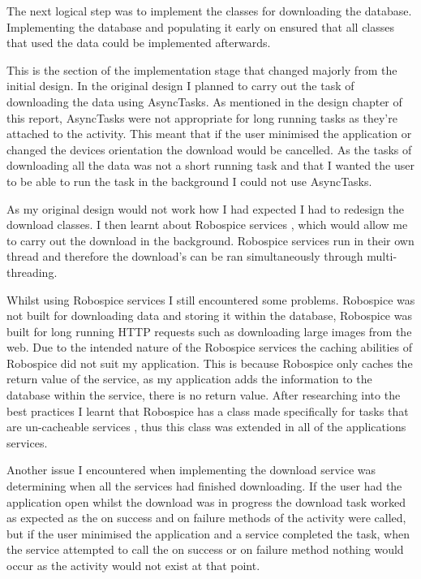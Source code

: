 The next logical step was to implement the classes for downloading the database. Implementing the database and populating it early on ensured that all classes that used the data could be implemented afterwards. 

This is the section of the implementation stage that changed majorly from the initial design. In the original design I planned to carry out the task of downloading the data using AsyncTasks. As mentioned in the design chapter of this report, AsyncTasks were not appropriate for long running tasks \cite{async_task} as they’re attached to the activity. This meant that if the user minimised the application or changed the devices orientation the download would be cancelled. As the tasks of downloading all the data was not a short running task and that I wanted the user to be able to run the task in the background I could not use AsyncTasks.

As my original design would not work how I had expected I had to redesign the download classes. I then learnt about Robospice services \cite{robospice}, which would allow me to carry out the download in the background. Robospice services run in their own thread \cite{robospice} and therefore the download’s can be ran simultaneously through multi-threading.

Whilst using Robospice services I still encountered some problems. Robospice was not built for downloading data and storing it within the database, Robospice was built for long running HTTP requests \cite{robospice} such as downloading large images from the web. Due to the intended nature of the Robospice services the caching abilities of Robospice did not suit my application. This is because Robospice only caches the return value of the service, as my application adds the information to the database within the service, there is no return value. After researching into the best practices I learnt that Robospice has a class made specifically for tasks that are un-cacheable services \cite{robospice}, thus this class was extended in all of the applications services.

Another issue I encountered when implementing the download service was determining when all the services had finished downloading. If the user had the application open whilst the download was in progress the download task worked as expected as the on success and on failure methods of the activity were called, but if the user minimised the application and a service completed the task, when the service attempted to call the on success or on failure method nothing would occur as the activity would not exist at that point.

